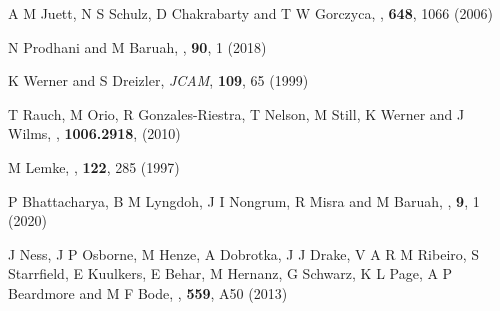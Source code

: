 \begin{thebibliography}{100}
	A M Juett, N S Schulz, D Chakrabarty and T W Gorczyca, \textit{\ApJ}, \textbf{648}, 1066 (2006)
	
	N Prodhani and M Baruah, \textit{\Pram}, \textbf{90}, 1 (2018)
	

	
	
	
	K Werner and S Dreizler, \textit{JCAM}, \textbf{109}, 65 (1999)
	
	T Rauch, M Orio, R Gonzales-Riestra, T Nelson, M Still, K Werner and J Wilms, \textit{\ARX}, \textbf{1006.2918}, (2010)
	
	M Lemke, \textit{\AnASS}, \textbf{122}, 285 (1997)
	
	P Bhattacharya, B M Lyngdoh, J I Nongrum, R Misra and M Baruah, \textit{\AJET}, \textbf{9}, 1 (2020)
	
	J Ness, J P Osborne, M Henze, A Dobrotka, J J Drake, V A R M Ribeiro, S Starrfield, E Kuulkers, E Behar, M Hernanz, G Schwarz, K L Page, A P Beardmore and M F Bode, \textit{\AnA}, \textbf{559}, A50 (2013)
\end{thebibliography}




